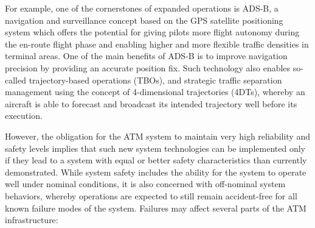\documentclass[a4paper, 10pt]{IEEEtran}
\begin{document}
For example, one of the cornerstones of expanded operations is ADS-B, a
navigation and surveillance concept based on the GPS satellite positioning
system which offers the potential for giving pilots more flight autonomy
during the en-route flight phase and enabling higher and more flexible
traffic densities in terminal
areas. One of the main benefits of ADS-B is to improve navigation precision by providing an accurate position fix. 
Such technology also enables so-called trajectory-based operations
(TBOs), and strategic traffic separation management using the concept of
4-dimensional trajectories (4DTs), whereby an aircraft is able to forecast and
broadcast its intended trajectory well before its execution.


However, the obligation for the ATM system to maintain very high
reliability and safety levels implies that such new system technologies can
be implemented
only if they lead to a system with equal or better
safety characteristics than currently demonstrated. While system safety
includes the
ability for the system to operate well under nominal conditions, it is also
concerned with off-nominal system behaviors, whereby operations are
expected to still remain accident-free for all known failure modes
of the system. Failures may affect several parts of the ATM infrastructure:
\end{document}

